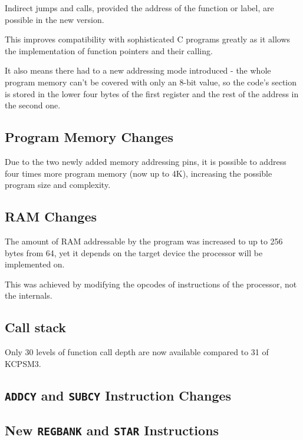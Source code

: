         Indirect jumps and calls, provided the address of the function or label, are possible in the new version.

        This improves compatibility with sophisticated C programs greatly as it allows the implementation of function pointers and their calling.

        It also means there had to a new addressing mode introduced - the whole program memory can't be covered with only an 8-bit value, so the code's section is stored in the lower four bytes of the first register and the rest of the address in the second one.

        \subsection{Program Memory Changes}

        Due to the two newly added memory addressing pins, it is possible to address four times more program memory (now up to 4K), increasing the possible program size and complexity.

        \subsection{RAM Changes}

        The amount of RAM addressable by the program was increased to up to 256 bytes from 64, yet it depends on the target device the processor will be implemented on. 

        This was achieved by modifying the opcodes of instructions of the processor, not the internals.

        \subsection{Call stack}

        Only 30 levels of function call depth are now available compared to 31 of KCPSM3.

        \subsection{\texttt{ADDCY} and \texttt{SUBCY} Instruction Changes}

        

        \subsection{New \texttt{REGBANK} and \texttt{STAR} Instructions}

